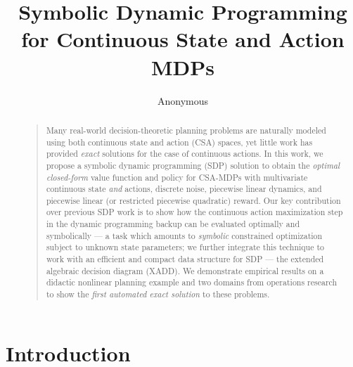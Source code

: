 \documentclass[letterpaper]{article}
\begin{document}
%
\title{Symbolic Dynamic Programming for Continuous State and Action MDPs}
\author{Anonymous}
\maketitle
\begin{abstract}
\begin{quote}
Many real-world decision-theoretic planning problems are naturally
modeled using both continuous state and action (CSA) spaces, yet
little work has provided \emph{exact} solutions for the case of
continuous actions.  In this work, we propose a symbolic dynamic
programming (SDP) solution to obtain the \emph{optimal closed-form}
value function and policy for CSA-MDPs with multivariate continuous
state \emph{and} actions, discrete noise, piecewise linear dynamics,
and piecewise linear (or restricted piecewise quadratic) reward.  Our
key contribution over previous SDP work is to show how the continuous
action maximization step in the dynamic programming backup can be
evaluated optimally and symbolically --- a task which amounts to
\emph{symbolic} constrained optimization subject to unknown state
parameters; we further integrate this technique to work with an
efficient and compact data structure for SDP --- the extended
algebraic decision diagram (XADD).  We demonstrate empirical results
on a didactic nonlinear planning example and two domains from operations
research to show the \emph{first automated exact solution} to these
problems.
\end{quote}
\end{abstract}

\section{Introduction}
\end{document}
